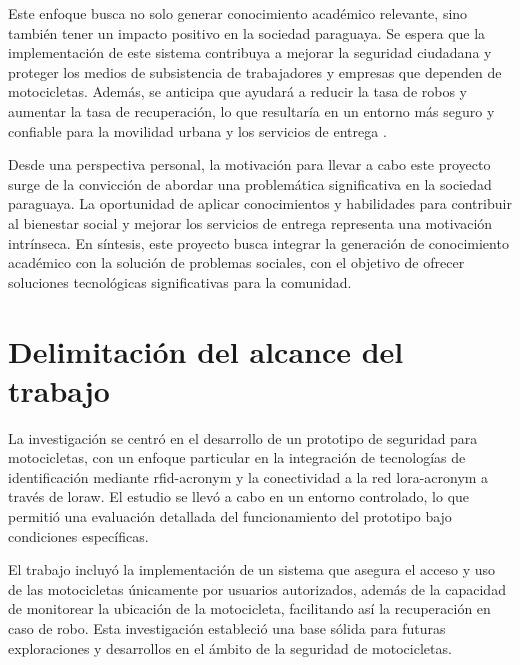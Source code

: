 Este enfoque busca no solo generar conocimiento académico relevante, sino también tener un impacto positivo en la sociedad paraguaya. Se espera que la implementación de este sistema contribuya a mejorar la seguridad ciudadana y proteger los medios de subsistencia de trabajadores y empresas que dependen de motocicletas. Además, se anticipa que ayudará a reducir la tasa de robos y aumentar la tasa de recuperación, lo que resultaría en un entorno más seguro y confiable para la movilidad urbana y los servicios de entrega \cite{informeAnual2021}.

Desde una perspectiva personal, la motivación para llevar a cabo este proyecto surge de la convicción de abordar una problemática significativa en la sociedad paraguaya. La oportunidad de aplicar conocimientos y habilidades para contribuir al bienestar social y mejorar los servicios de entrega representa una motivación intrínseca. En síntesis, este proyecto busca integrar la generación de conocimiento académico con la solución de problemas sociales, con el objetivo de ofrecer soluciones tecnológicas significativas para la comunidad.



\section{Delimitación del alcance del trabajo}
La investigación se centró en el desarrollo de un prototipo de seguridad para motocicletas, con un enfoque particular en la integración de tecnologías de identificación mediante \acrshort{rfid-acronym} y la conectividad a la red \acrshort{lora-acronym} a través de \acrshort{loraw}. El estudio se llevó a cabo en un entorno controlado, lo que permitió una evaluación detallada del funcionamiento del prototipo bajo condiciones específicas.

El trabajo incluyó la implementación de un sistema que asegura el acceso y uso de las motocicletas únicamente por usuarios autorizados, además de la capacidad de monitorear la ubicación de la motocicleta, facilitando así la recuperación en caso de robo. Esta investigación estableció una base sólida para futuras exploraciones y desarrollos en el ámbito de la seguridad de motocicletas. 



